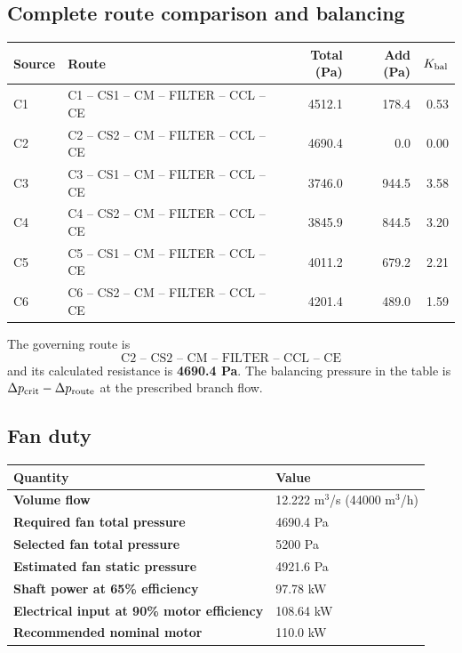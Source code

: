 \documentclass[11pt,a4paper]{article}
\begin{document}
\subsection{Complete route comparison and balancing}
\begin{center}\small
\begin{tabular}{llrrr}
\toprule
Source & Route & Total (Pa) & Add (Pa) & $K_{\rm bal}$\\
\midrule
C1 & C1 -- CS1 -- CM -- FILTER -- CCL -- CE & 4512.1 & 178.4 & 0.53 \\
C2 & C2 -- CS2 -- CM -- FILTER -- CCL -- CE & 4690.4 & 0.0 & 0.00 \\
C3 & C3 -- CS1 -- CM -- FILTER -- CCL -- CE & 3746.0 & 944.5 & 3.58 \\
C4 & C4 -- CS2 -- CM -- FILTER -- CCL -- CE & 3845.9 & 844.5 & 3.20 \\
C5 & C5 -- CS1 -- CM -- FILTER -- CCL -- CE & 4011.2 & 679.2 & 2.21 \\
C6 & C6 -- CS2 -- CM -- FILTER -- CCL -- CE & 4201.4 & 489.0 & 1.59 \\
\bottomrule
\end{tabular}
\end{center}
The governing route is
\[
\boxed{\text{C2 -- CS2 -- CM -- FILTER -- CCL -- CE}}
\]
and its calculated resistance is \textbf{4690.4 Pa}. The balancing pressure in the table is $\Delta p_{\rm crit}-\Delta p_{\rm route}$ at the prescribed branch flow.

\subsection{Fan duty}
\begin{center}
\begin{tabularx}{0.82\textwidth}{>{\bfseries}l X}
\toprule
Quantity & Value\\
\midrule
Volume flow & 12.222 m$^3$/s (44000 m$^3$/h)\\
Required fan total pressure & 4690.4 Pa\\
Selected fan total pressure & 5200 Pa\\
Estimated fan static pressure & 4921.6 Pa\\
Shaft power at 65\% efficiency & 97.78 kW\\
Electrical input at 90\% motor efficiency & 108.64 kW\\
Recommended nominal motor & 110.0 kW\\
\bottomrule
\end{tabularx}
\end{center}
\end{document}
